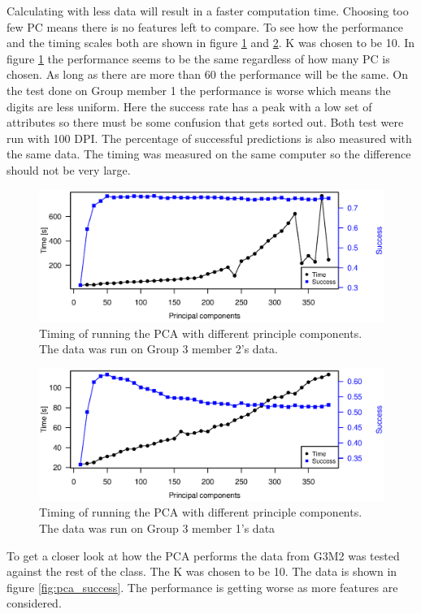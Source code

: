 Calculating with less data will result in a faster computation time.
Choosing too few PC means there is no features left to compare.
To see how the performance and the timing scales both are shown in figure \ref{fig:pca_timing_lukas} and \ref{fig:pca_timing_nikolaj}. K was chosen to be 10.
In figure \ref{fig:pca_timing_lukas} the performance seems to be the same regardless of how many PC is chosen. As long as there are more than 60 the performance will be the same.
On the test done on Group member 1 the performance is worse which means the digits are less uniform. 
Here the success rate has a peak with a low set of attributes so there must be some confusion that gets sorted out. 
Both test were run with 100 DPI. The percentage of successful predictions is also measured with the same data.
The timing was measured on the same computer so the difference should not be very large. 

\begin{figure}[H]
\centering
\includegraphics[width =0.8 \textwidth]{graphics/pca_timing}
\caption[Timing of PCA]{Timing of running the PCA with different principle components. 
The data was run on Group 3 member 2's data. 
}
\label{fig:pca_timing_lukas}
\end{figure}
\begin{figure}[H]
\centering
\includegraphics[width =0.8 \textwidth]{graphics/pca_timing_nikolaj}
\caption[Timing of PCA]{Timing of running the PCA with different principle components. 
The data was run on Group 3 member 1's data}
\label{fig:pca_timing_nikolaj}
\end{figure}

To get a closer look at how the PCA performs the data from G3M2 was tested against the rest of the class. 
The K was chosen to be 10. 
The data is shown in figure \ref{fig:pca_success}.
The performance is getting worse as more features are considered.

\begin{figure}[H]
\centering
{}
\end{figure}


